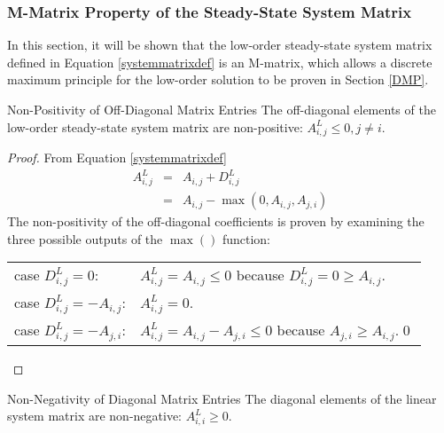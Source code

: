 \subsubsection{M-Matrix Property of the Steady-State System Matrix}
In this section, it will be shown that the low-order steady-state
system matrix defined in Equation \eqref{systemmatrixdef} is an M-matrix, which
allows a discrete maximum principle for the low-order solution to be proven in
Section \ref{DMP}.
\begin{lemma}[label={offdiagonalnegative}]{Non-Positivity of Off-Diagonal Matrix Entries}
   The off-diagonal elements of the low-order steady-state system matrix
   are non-positive: $A^L_{i,j}\le 0, j\ne i$.
\end{lemma}
\begin{proof}
From Equation \eqref{systemmatrixdef}
\begin{eqnarray*}
	A^L_{i,j} & = & A_{i,j} + D_{i,j}^L\\
             & = & A_{i,j} - \max(0,A_{i,j},A_{j,i})
\end{eqnarray*}
The non-positivity of the off-diagonal coefficients is proven by examining the three possible
outputs of the $\max()$ function:

\begin{tabular}{l l}
   case $D_{i,j}^L=0$:        & $A^L_{i,j} = A_{i,j} \leq 0$ because
      $D_{i,j}^L=0\geq A_{i,j}$.\\
   case $D_{i,j}^L=-A_{i,j}$: & $A^L_{i,j} = 0$.\\
   case $D_{i,j}^L=-A_{j,i}$: & $A^L_{i,j} = A_{i,j} - A_{j,i} \leq 0$ because
      $A_{j,i} \geq A_{i,j}$.\qed
\end{tabular}
\end{proof}
\begin{lemma}[label={diagonalpositive}]{Non-Negativity of Diagonal Matrix Entries}
   The diagonal elements of the linear system matrix are non-negative: $A^L_{i,i}\ge 0$.
\end{lemma}
